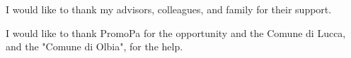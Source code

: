 \documentclass[../main.tex]{subfiles}
\begin{document}
\begin{acknowledgments}
I would like to thank my advisors, colleagues, and family for their support.

I would like to thank PromoPa for the opportunity and the Comune di Lucca, and the "Comune di Olbia", for the help.



\end{acknowledgments}
\end{document}
